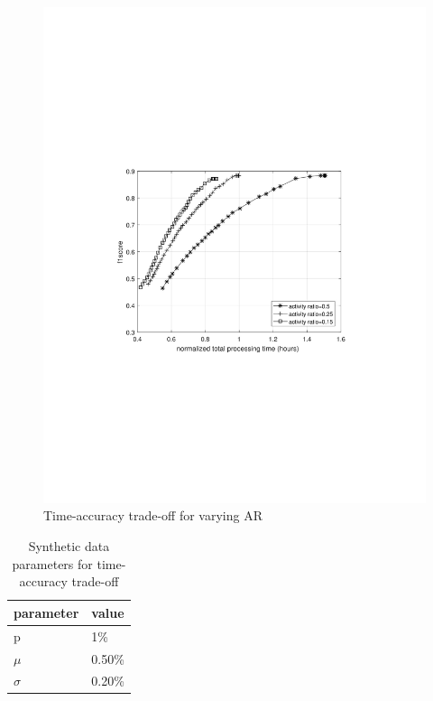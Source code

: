\begin{figure}
    \centering
    \includegraphics[width=\linewidth,trim={300 670 300 690},clip]{images/time-acc-tradeoff-ar-mog.jpg}
    \caption{Time-accuracy trade-off for varying AR}
    \label{fig:time-acc-tradeoff-ar-mog}
\end{figure}

\begin{table}
\centering
\caption{Synthetic data parameters for time-accuracy trade-off} \vspace{5pt}
\label{table:fig1_data_params}
\begin{tabular}{|l|l|}
\hline
parameter             & value  \\ \hline \hline
p                     & 1\%    \\ \hline
$\mu$    & 0.50\% \\ \hline
$\sigma$ & 0.20\% \\ \hline
\end{tabular}
\end{table}


